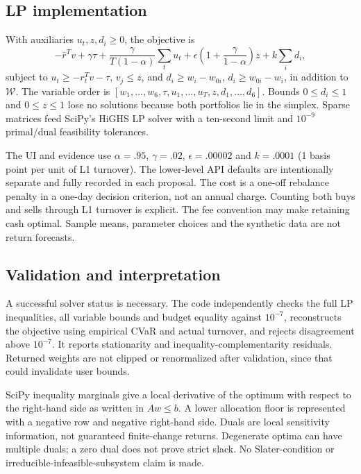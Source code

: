 \documentclass[11pt,a4paper]{article}
\begin{document}
\subsection{LP implementation}
With auxiliaries $u_t,z,d_i\geq0$, the objective is
\[
 -\bar r^Tv+\gamma\tau+\frac\gamma{T(1-\alpha)}\sum_tu_t
 +\epsilon\left(1+\frac\gamma{1-\alpha}\right)z+k\sum_id_i,
\]
subject to $u_t\geq-r_t^Tv-\tau$, $v_j\leq z$, and
$d_i\geq w_i-w_{0i}$, $d_i\geq w_{0i}-w_i$, in addition to $\mathcal W$.
The variable order is $[w_1,\ldots,w_6,\tau,u_1,\ldots,u_T,z,d_1,\ldots,d_6]$.
Bounds $0\leq d_i\leq1$ and $0\leq z\leq1$ lose no solutions because both portfolios lie in the simplex. Sparse matrices feed SciPy's HiGHS LP solver with a ten-second limit and $10^{-9}$ primal/dual feasibility tolerances.

The UI and evidence use $\alpha=.95$, $\gamma=.02$, $\epsilon=.00002$ and $k=.0001$ (1 basis point per unit of L1 turnover). The lower-level API defaults are intentionally separate and fully recorded in each proposal. The cost is a one-off rebalance penalty in a one-day decision criterion, not an annual charge. Counting both buys and sells through L1 turnover is explicit. The fee convention may make retaining cash optimal. Sample means, parameter choices and the synthetic data are not return forecasts.

\subsection{Validation and interpretation}
A successful solver status is necessary. The code independently checks the full LP inequalities, all variable bounds and budget equality against $10^{-7}$, reconstructs the objective using empirical CVaR and actual turnover, and rejects disagreement above $10^{-7}$. It reports stationarity and inequality-complementarity residuals. Returned weights are not clipped or renormalized after validation, since that could invalidate user bounds.

SciPy inequality marginals give a local derivative of the optimum with respect to the right-hand side as written in $Aw\leq b$. A lower allocation floor is represented with a negative row and negative right-hand side. Duals are local sensitivity information, not guaranteed finite-change returns. Degenerate optima can have multiple duals; a zero dual does not prove strict slack. No Slater-condition or irreducible-infeasible-subsystem claim is made.
\end{document}
